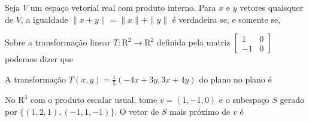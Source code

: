 \documentclass[10pt,a4paper]{article}
\begin{document}
{
\def\AMCbeginQuestion#1#2{\par\noindent{\bf (POSCOMP 2004 - Questão 02)}}
\begin{question}{} Seja $V$ um espaço vetorial real com produto interno. Para $x$ e $y$ vetores quaisquer de $V$, a igualdade $\|x+y\|=\|x\|+\|y\|$ é verdadeira se, e somente se,
\begin{choices}
\end{choices}
\end{question}
}
%
{
\def\AMCbeginQuestion#1#2{\par\noindent{\bf (POSCOMP 2004 - Questão 03)}}
\begin{question}{} Sobre a transformação linear $T:\mathrm{R}^{2}\to\mathrm{R}^{2}$ definida pela matriz $\left[\begin{array}{rr}1&0\\-1&0\end{array}\right]$ podemos dizer que
\begin{choices}
\end{choices}
\end{question}
}
%
{
\def\AMCbeginQuestion#1#2{\par\noindent{\bf (POSCOMP 2004 - Questão 04)}}
\begin{question}{} A transformação $T(x,y)=\frac{1}{5}(-4x+3y,3x+4y)$ do plano no plano é
\begin{choices}
\end{choices}
\end{question}
}
%
{
\def\AMCbeginQuestion#1#2{\par\noindent{\bf (POSCOMP 2004 - Questão 05)}}
\begin{question}{} No $\mathrm{R}^{3}$ com o produto escalar usual, tome $v=(1,-1,0)$ e o subespaço $S$ gerado por $\{(1,2,1),(-1,1,-1)\}$. O vetor de $S$ mais próximo de $v$ é
\begin{choices}
\end{choices}
\end{question}
}
\end{document}
